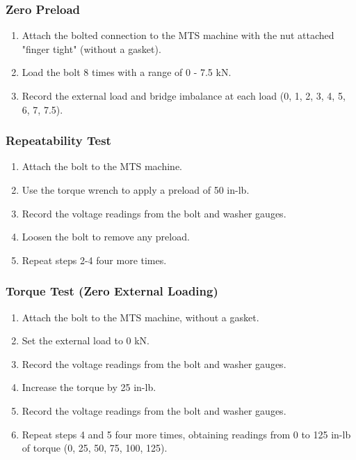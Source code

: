 \subsubsection{Zero Preload}
\begin{enumerate}
    \item Attach the bolted connection to the MTS machine with the nut attached "finger tight" (without a gasket).
    \item Load the bolt 8 times with a range of 0 - 7.5 kN.
    \item Record the external load and bridge imbalance at each load (0, 1, 2, 3, 4, 5, 6, 7, 7.5).
\end{enumerate}
\subsubsection{Repeatability Test}
\begin{enumerate}
    \item Attach the bolt to the MTS machine.
    \item Use the torque wrench to apply a preload of 50 in-lb.
    \item Record the voltage readings from the bolt and washer gauges.
    \item Loosen the bolt to remove any preload.
    \item Repeat steps 2-4 four more times.
\end{enumerate}
\subsubsection{Torque Test (Zero External Loading)}
\begin{enumerate}
    \item Attach the bolt to the MTS machine, without a gasket.
    \item Set the external load to 0 kN.
    \item Record the voltage readings from the bolt and washer gauges.
    \item Increase the torque by 25 in-lb.
    \item Record the voltage readings from the bolt and washer gauges.
    \item Repeat steps 4 and 5 four more times, obtaining readings from 0 to 125 in-lb of torque (0, 25, 50, 75, 100, 125).
\end{enumerate}
